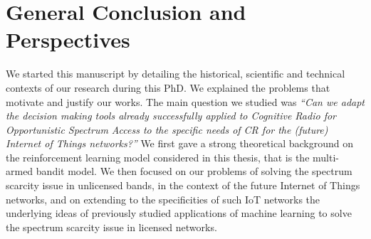 
\chapter{General Conclusion and Perspectives}
\label{chapter:conclusion}

\graphicspath{{2-Chapters/6-Chapter/Images/}}




We started this manuscript by detailing the historical, scientific and technical contexts of our research during this PhD.
%
We explained the problems that motivate and justify our works.
%
The main question we studied was \emph{``Can we adapt the decision making tools already successfully applied to Cognitive Radio for Opportunistic Spectrum Access to the specific needs of CR for the (future) Internet of Things networks?''}
%
We first gave a strong theoretical background on the reinforcement learning model considered in this thesis, that is the multi-armed bandit model.
We then focused on our problems of solving the spectrum scarcity issue in unlicensed bands, in the context of the future Internet of Things networks,
and on extending to the specificities of such IoT networks the underlying ideas of previously studied applications of machine learning to solve the spectrum scarcity issue in licensed networks.


